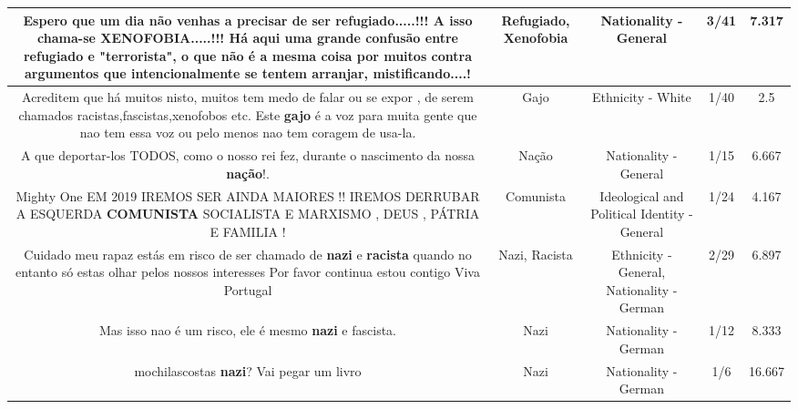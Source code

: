 \documentclass[11pt]{article}
\newlength\mylength
\begin{document}
\begin{center}
\begin{longtable}{|C{.65\mylength}|C{.30\mylength}|C{.12\mylength}|C{.12\mylength}|C{.12\mylength}|}
  \small Espero que um dia não venhas a precisar de ser \textbf{refugiado}.....!!! A isso chama-se \textbf{XENOFOBIA}.....!!! Há aqui uma grande confusão entre \textbf{refugiado} e "terrorista", o que não é a mesma coisa por muitos contra argumentos que intencionalmente se tentem arranjar, mistificando....!\normalsize   & Refugiado, Xenofobia & Nationality - General & 3/41 & 7.317 \\  \hline
  \small Acreditem que há muitos nisto, muitos tem medo de falar ou se expor , de serem chamados racistas,fascistas,xenofobos etc. Este \textbf{gajo} é a voz para muita gente que nao tem essa voz ou pelo menos nao tem coragem de usa-la.\normalsize   & Gajo & Ethnicity - White & 1/40 & 2.5 \\  \hline
  \small A que deportar-los TODOS, como o nosso rei fez, durante o nascimento da nossa \textbf{nação}!.\normalsize   & Nação & Nationality - General & 1/15 & 6.667 \\  \hline
  \small Mighty One EM 2019 IREMOS SER AINDA MAIORES !! IREMOS DERRUBAR A ESQUERDA \textbf{COMUNISTA} SOCIALISTA E MARXISMO , DEUS , PÁTRIA E FAMILIA !\normalsize   & Comunista & Ideological and Political Identity - General & 1/24 & 4.167 \\  \hline
  \small Cuidado meu rapaz estás em risco de ser chamado de \textbf{nazi} e \textbf{racista} quando no entanto só estas olhar pelos nossos interesses Por favor continua estou contigo Viva Portugal\normalsize   & Nazi, Racista & Ethnicity - General, Nationality - German & 2/29 & 6.897 \\  \hline
  \small Mas isso nao é um risco, ele é mesmo \textbf{nazi} e fascista.\normalsize   & Nazi & Nationality - German & 1/12 & 8.333 \\  \hline
  \small mochilascostas \textbf{nazi}? Vai pegar um livro\normalsize   & Nazi & Nationality - German & 1/6 & 16.667 \\  \hline

\end{longtable}
\end{center}
\end{document}
